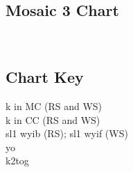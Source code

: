\documentclass[12pt]{article}
\begin{document}
\vspace{-1in}
\begin{multicols}{2}
\subsection*{Mosaic 3 Chart}
\vspace{-2.7in}


~\vfill
\columnbreak
~
\vspace{3em}

\begin{addmargin}[8em]{0em}
\subsection*{Chart Key}
\textknit{-} k in MC (RS and WS) \\

\textknit{=} k in CC (RS and WS) \\

 sl1 wyib (RS); sl1 wyif (WS) \\

 yo \\

\textknit{>} k2tog 
\end{addmargin}

\end{multicols}

\normalsize
\end{document}

